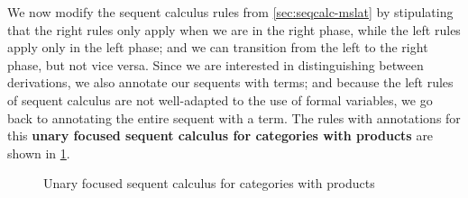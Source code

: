 \documentclass{book}
\def\idfunc{\mathsf{id}}
\let\types\vdash
\def\type{\;\ftype}
\newcommand{\focus}[1]{[#1]}
\newcommand{\postcsym}[1]{#1\mathord{\circ}}
\newcommand{\postc}[2]{\postcsym{#1}(#2)}
\newcommand{\precsym}[1]{\mathord{\circ}#1}
\renewcommand{\prec}[2]{(#1)\precsym{#2}}
\def\ttt{\mathsf{tt}}
\def\pair#1#2{\langle #1,#2\rangle}
\begin{document}
We now modify the sequent calculus rules from \cref{sec:seqcalc-mslat} by stipulating that
the right rules only apply when we are in the right phase,
while the left rules apply only in the left phase;
and we can transition from the left to the right phase, but not vice versa.
Since we are interested in distinguishing between derivations, we also annotate our sequents with terms; and
because the left rules of sequent calculus are not well-adapted to the use of formal variables, we go back to annotating the entire sequent with a term.
The rules with annotations for this \textbf{unary focused sequent calculus for categories with products} are shown in \cref{fig:catprod-focused-seqcalc}.

\begin{figure}
  \centering
  \caption{Unary focused sequent calculus for categories with products}
  \label{fig:catprod-focused-seqcalc}
\end{figure}
\end{document}
